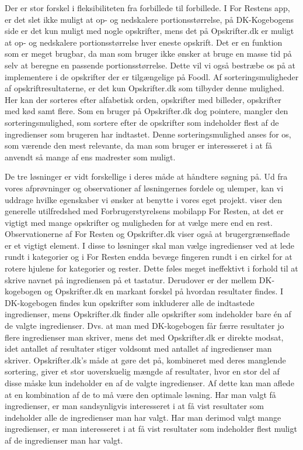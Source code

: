 Der er stor forskel i fleksibiliteten fra forbillede til forbillede. I For Restens app, er det slet ikke muligt at op- og nedskalere portionsstørrelse, på DK-Kogebogens side er det kun muligt med nogle opskrifter, mens det på Opskrifter.dk er muligt at op- og nedskalere portionsstørrelse hver eneste opskrift. Det er en funktion som er meget brugbar, da man som bruger ikke ønsker at bruge en masse tid på selv at beregne en passende portionsstørrelse. Dette vil vi også bestræbe os på at implementere i de opskrifter der er tilgængelige på Foodl. Af sorteringsmuligheder af opskriftresultaterne, er det kun Opskrifter.dk som tilbyder denne mulighed. Her kan der sorteres efter alfabetisk orden, opskrifter med billeder, opskrifter med kød samt flere. Som en bruger på Opskrifter.dk dog pointere, mangler den sorteringsmulighed, som sortere efter de opskrifter som indeholder flest af de ingredienser som brugeren har indtastet. Denne sorteringsmulighed anses for os, som værende den mest relevante, da man som bruger er interesseret i at få anvendt så mange af ens madrester som muligt. 

De tre løsninger er vidt forskellige i deres måde at håndtere søgning på. Ud fra vores afprøvninger og observationer af løsningernes fordele og ulemper, kan vi uddrage hvilke egenskaber vi ønsker at benytte i vores eget projekt. \Fx viser den generelle utilfredshed med Forbrugerstyrelsens mobilapp For Resten, at det er vigtigt med mange opskrifter og muligheden for at vælge mere end en rest. Observationerne af For Resten og Opskrifter.dk viser også at brugergrænseflade er et vigtigt element. I disse to løsninger skal man vælge ingredienser ved at lede rundt i kategorier og i For Resten endda bevæge fingeren rundt i en cirkel for at rotere hjulene for kategorier og rester. Dette føles meget ineffektivt i forhold til at skrive navnet på ingrediensen på et tastatur. Derudover er der mellem DK-kogebogen og Opskrifter.dk en markant forskel på hvordan resultater findes. I DK-kogebogen findes kun opskrifter som inkluderer alle de indtastede ingredienser, mens Opskrifter.dk finder alle opskrifter som indeholder bare én af de valgte ingredienser. Dvs. at man med DK-kogebogen får færre resultater jo flere ingredienser man skriver, mens det med Opskrifter.dk er direkte modsat, idet antallet af resultater stiger voldsomt med antallet af ingredienser man skriver. Opskrifter.dk’s måde at gøre det på, kombineret med deres manglende sortering, giver et stor uoverskuelig mængde af resultater, hvor en stor del af disse måske kun indeholder en af de valgte ingredienser. Af dette kan man aflede at en kombination af de to må være den optimale løsning. Har man valgt få ingredienser, er man sandsynligvis interesseret i at få vist resultater som indeholder alle de ingredienser man har valgt. Har man derimod valgt mange ingredienser, er man interesseret i at få vist resultater som indeholder flest muligt af de ingredienser man har valgt.